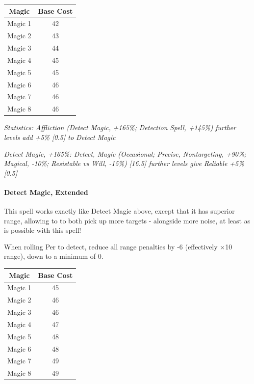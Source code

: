 \begin{multicols*}{3}
	\begin{center}
		\begin{tabular}{|c|c|}
			\hline
			Magic & Base Cost \\
			\hline
			\hline
			Magic 1 & 42 \\
			Magic 2 & 43 \\
			Magic 3 & 44 \\
			Magic 4 & 45 \\
			Magic 5 & 45 \\
			Magic 6 & 46 \\
			Magic 7 & 46 \\
			Magic 8 & 46 \\
			\hline
		\end{tabular}
	\end{center} 
	
	\textcolor{OliveGreen}{\textit{ Statistics: Affliction (Detect Magic, +165\%; Detection Spell, +145\%) further levels add +5\% [0.5] to Detect Magic}}
	
	\textcolor{OliveGreen}{\textit{Detect Magic, +165\%: Detect, Magic (Occasional; Precise, Nontargeting, +90\%; Magical, -10\%; Resistable vs Will, -15\%) [16.5] further levels give Reliable +5\% [0.5]}}
	
	\paragraph{Detect Magic, Extended}
	
	This spell works exactly like Detect Magic above, except that it has superior range, allowing to to both pick up more targets - alongside more noise, at least as is possible with this spell!
	
	When rolling Per to detect, reduce all range penalties by -6 (effectively $\times$10 range), down to a minimum of 0.
	
	\begin{center}
		\begin{tabular}{|c|c|}
			\hline
			Magic & Base Cost \\
			\hline
			\hline
			Magic 1 & 45 \\
			Magic 2 & 46 \\
			Magic 3 & 46 \\
			Magic 4 & 47 \\
			Magic 5 & 48 \\
			Magic 6 & 48 \\
			Magic 7 & 49 \\
			Magic 8 & 49 \\
			\hline
		\end{tabular}
	\end{center} 
	

\end{multicols*}
